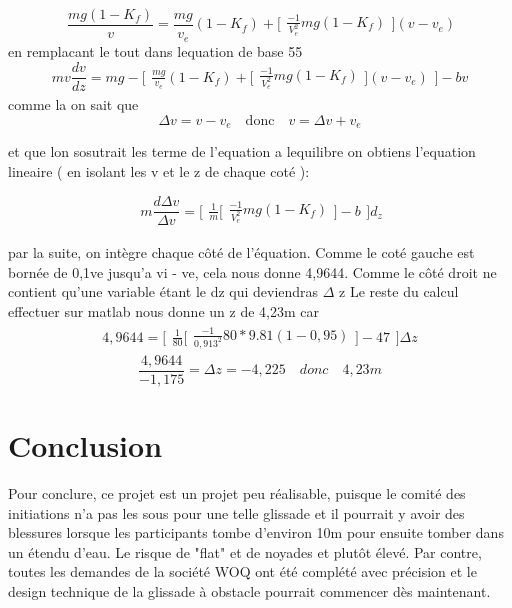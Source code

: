 \documentclass{article}
\begin{document}
\begin{equation}
\ \frac{mg ( 1- K_{f})}{v} = \frac{mg}{v_{e}}(1-K_{f})+
\Bigg[\begin{array}{cc}
    \frac{-1}{V_{e}^2}mg(1-K_{f})
    \end{array}\Bigg]
    (v-v_{e})
\end{equation}
en remplacant le tout dans lequation de base 55
\begin{equation}
mv \frac{dv}{dz} = mg - \Bigg[\begin{array}{cc}
\frac{mg}{v_{e}}(1-K_{f})+
\Bigg[\begin{array}{cc}
    \frac{-1}{V_{e}^2}mg(1-K_{f})
    \end{array}\Bigg]
    (v-v_{e}) \end{array}\Bigg] - bv
\end{equation}
comme la on sait que
\begin{equation}
\Delta v = v - v_{e}  \quad  \textrm{donc} \quad    v = \Delta v+ v_{e}
\end{equation}

et que lon sosutrait les terme de l'equation a lequilibre on obtiens l'equation lineaire  ( en isolant les v et le z de chaque coté ):

\begin{equation}
\ m \frac{d \Delta v}{\Delta v}= \Bigg[\begin{array}{cc} \frac{1}{m} \Bigg[\begin{array}{cc}
    \frac{-1}{V_{e}^2}mg(1-K_{f})
    \end{array}\Bigg]  - b\end{array}\Bigg] d_{z}
\end{equation}

par la suite, on intègre chaque côté de l'équation. Comme le coté gauche est bornée de 0,1ve jusqu'a vi - ve, cela nous donne 4,9644. Comme le côté droit ne contient qu'une variable étant le dz qui deviendras $\Delta$ z
 Le reste du calcul effectuer sur matlab nous donne un z de 4,23m car 
 \begin{equation}
 4,9644 = \Bigg[\begin{array}{cc} \frac{1}{80} \Bigg[\begin{array}{cc}
    \frac{-1}{0,913^2}80*9.81(1-0,95)
    \end{array}\Bigg]  - 47\end{array}\Bigg] \Delta z
 \end{equation}
 \begin{equation}
 \frac{4,9644}{ -1,175}= \Delta z = -4,225 \quad donc \quad 4,23 m
 \end{equation}
 \section{Conclusion}
Pour conclure, ce projet est un projet peu réalisable, puisque le comité des initiations n'a pas les sous pour une telle glissade et il pourrait y avoir des blessures lorsque les participants tombe d'environ 10m pour ensuite tomber dans un étendu d'eau. Le risque de "flat" et de noyades et plutôt élevé. Par contre, toutes les demandes de la société WOQ ont été complété avec précision et le design technique de la glissade à obstacle pourrait commencer dès maintenant.
\end{document}
